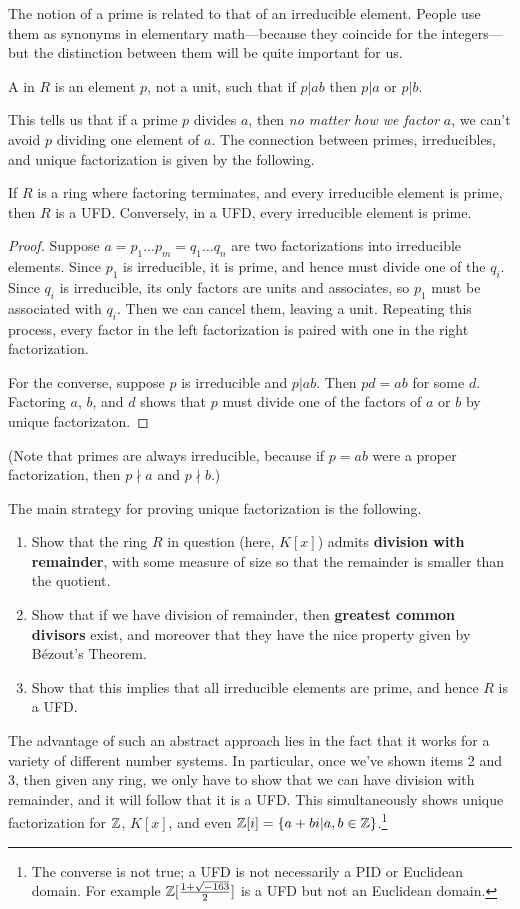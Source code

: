 The notion of a prime is related to that of an irreducible element. People use them as synonyms in elementary math---because they coincide for the integers---but the distinction between them will be quite important for us.
\begin{df}
A  in $R$ is an element $p$, not a unit, such that if $p|ab$ then $p|a$ or $p|b$.
\end{df}
This tells us that if a prime $p$ divides $a$, then {\it no matter how we factor }$a$, we can't avoid $p$ dividing one element of $a$. The connection between primes, irreducibles, and unique factorization is given by the following.
\begin{lem}
If $R$ is a ring where factoring terminates, and every irreducible element is prime, then $R$ is a UFD. Conversely, in a UFD, every irreducible element is prime.
\end{lem}
\begin{proof}
Suppose $a=p_1\ldots p_m=q_1\ldots q_n$ are two factorizations into irreducible elements. Since $p_1$ is irreducible, it is prime, and hence must divide one of the $q_i$. Since $q_i$ is irreducible, its only factors are units and associates, so $p_1$ must be associated with $q_i$. Then we can cancel them, leaving a unit. Repeating this process, every factor in the left factorization is paired with one in the right factorization.

For the converse, suppose $p$ is irreducible and $p|ab$. Then $pd=ab$ for some $d$. Factoring $a$, $b$, and $d$ shows that $p$ must divide one of the factors of $a$ or $b$ by unique factorizaton.
\end{proof}
(Note that primes are always irreducible, because if $p=ab$ were a proper factorization, then $p\nmid a$ and $p\nmid b$.)

The main strategy for proving unique factorization is the following.
\begin{enumerate}
\item Show that the ring $R$ in question (here, $K[x]$) admits \textbf{division with remainder}, with some measure of size so that the remainder is smaller than the quotient.
\item Show that if we have division of remainder, then \textbf{greatest common divisors} exist, and moreover that they have the nice property given by B\'ezout's Theorem.
\item Show that this implies that all irreducible elements are prime, and hence $R$ is a UFD.
\end{enumerate}
The advantage of such an abstract approach lies in the fact that it works for a variety of different number systems. In particular, once we've shown items 2 and 3, then given any ring, we only have to show that we can have division with remainder, and it will follow that it is a UFD. This simultaneously shows unique factorization for $\mathbb{Z}$, $K[x]$, and even $\mathbb{Z}[i]=\{a+bi|a,b\in \mathbb{Z}\}$.\footnote{The converse is not true; a UFD is not necessarily a PID or Euclidean domain. For example $\mathbb{Z}[\frac{1+\sqrt{-163}}{2}]$ is a UFD but not an Euclidean domain.}

